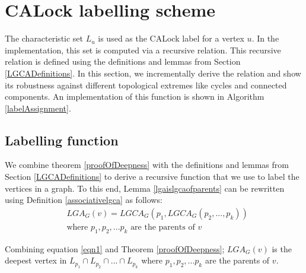 \section{CALock labelling scheme} \label{sec:labellingScheme}
The characteristic set $L_u$ is used as the CALock label for a vertex $u$.  
In the implementation, this set is computed via a recursive relation. 
This recursive relation is defined using the definitions and lemmas from Section \ref{LGCADefinitions}. 
In this section, we incrementally derive the relation and show its robustness against different topological extremes like cycles and connected components.  
An implementation of this function is shown in Algorithm \ref{labelAssignment}.


\subsection{Labelling function} \label{sec:recursivelabellingfunction}

We combine theorem \ref{proofOfDeepness} with the definitions and lemmas from Section \ref{LGCADefinitions} to derive a recursive function that we use to label the vertices in a graph. To this end,
Lemma \ref{lgaislgcaofparents} can be rewritten using Definition \ref{associativelgca} as follows:
\begin{equation}\label{eqn1}
\begin{split}
    &{LGA_G(v) = LGCA_G (p_1, LGCA_G (p_2,...,p_k))}
    \\ &\text{where } p_1, p_2, ... p_k \text{ are the parents of } v
\end{split}
\end{equation}


Combining equation \ref{eqn1} and Theorem \ref{proofOfDeepness}; $LGA_G(v)$ is the deepest vertex in $ L_{p_1} \cap L_{p_2} \cap ... \cap L_{p_k}$ where $p_1, p_2, ... p_k$ are the parents of $v$.

